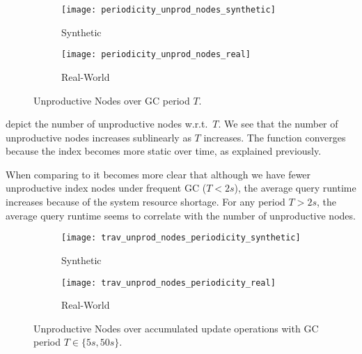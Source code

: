 \documentclass[abstracton,12pt]{scrartcl}
\theoremstyle{definition}
\begin{document}
\vspace{-0.4cm}

\begin{figure}[H]
  \centering
  \begin{subfigure}{0.49\linewidth}
    \centering
    \caption{Synthetic}
    \texttt{[image: periodicity\_unprod\_nodes\_synthetic]}
    \label{fig:periodicity_unprod_nodes_synthetic}
  \end{subfigure}
  \begin{subfigure}{0.49\linewidth}
    \centering
    \caption{Real-World}
    \texttt{[image: periodicity\_unprod\_nodes\_real]}
    \label{fig:periodicity_unprod_nodes_real}
  \end{subfigure}
  \vspace{-0.65cm}
  \caption[Unproductive Nodes over GC period $T$]{Unproductive Nodes over GC period $T$.}
\end{figure}

\vspace{-0.2cm}

depict the number of unproductive nodes w.r.t.\ $T$. We see that the
number of unproductive nodes increases sublinearly as $T$ increases.
The function converges because the index becomes more static over time, as
explained previously.

When comparing 
to
it becomes more clear that although we have fewer unproductive
index nodes under frequent GC ($T < 2s$), the average query runtime increases
because of the system resource shortage. For any period $T > 2s$, the
average query runtime seems to correlate with the number of
unproductive nodes.

\vspace{-0.8cm}

\begin{figure}[H]
  \centering
  \begin{subfigure}{0.49\linewidth}
    \centering
    \caption{Synthetic}
    \texttt{[image: trav\_unprod\_nodes\_periodicity\_synthetic]}
    \label{fig:trav_unprod_nodes_periodicity_synthetic}
  \end{subfigure}
  \begin{subfigure}{0.49\linewidth}
    \centering
    \caption{Real-World}
    \texttt{[image: trav\_unprod\_nodes\_periodicity\_real]}
    \label{fig:trav_unprod_nodes_periodicity_real}
  \end{subfigure}
  \vspace{-0.65cm}
  \caption[Unproductive Nodes over update operations with GC period $T \in \{5s, 50s\}$]{
  Unproductive Nodes over accumulated update operations with GC period $T \in \{5s, 50s\}$.}
\end{figure}
\end{document}
